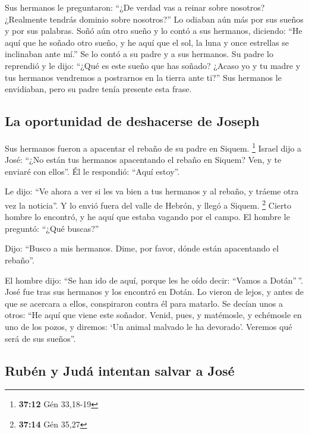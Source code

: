 \begin{paracol}{2}
 Sus hermanos le preguntaron: ``¿De verdad vas a reinar
sobre nosotros? ¿Realmente tendrás dominio sobre nosotros?'' Lo odiaban
aún más por sus sueños y por sus palabras.  Soñó aún otro
sueño y lo contó a sus hermanos, diciendo: ``He aquí que he soñado otro
sueño, y he aquí que el sol, la luna y once estrellas se inclinaban ante
mí.''  Se lo contó a su padre y a sus hermanos. Su padre
lo reprendió y le dijo: ``¿Qué es este sueño que has soñado? ¿Acaso yo y
tu madre y tus hermanos vendremos a postrarnos en la tierra ante ti?''
 Sus hermanos le envidiaban, pero su padre tenía presente
esta frase.

\hypertarget{la-oportunidad-de-deshacerse-de-joseph}{%
\subsection{La oportunidad de deshacerse de
Joseph}\label{la-oportunidad-de-deshacerse-de-joseph}}

 Sus hermanos fueron a apacentar el rebaño de su padre en
Siquem. \footnote{\textbf{37:12} Gén 33,18-19}  Israel
dijo a José: ``¿No están tus hermanos apacentando el rebaño en Siquem?
Ven, y te enviaré con ellos''. Él le respondió: ``Aquí estoy''.

 Le dijo: ``Ve ahora a ver si les va bien a tus hermanos
y al rebaño, y tráeme otra vez la noticia''. Y lo envió fuera del valle
de Hebrón, y llegó a Siquem. \footnote{\textbf{37:14} Gén 35,27}
 Cierto hombre lo encontró, y he aquí que estaba vagando
por el campo. El hombre le preguntó: ``¿Qué buscas?''

 Dijo: ``Busco a mis hermanos. Dime, por favor, dónde
están apacentando el rebaño''.

 El hombre dijo: ``Se han ido de aquí, porque les he oído
decir: ``Vamos a Dotán''\,''. José fue tras sus hermanos y los encontró
en Dotán.  Lo vieron de lejos, y antes de que se acercara
a ellos, conspiraron contra él para matarlo.  Se decían
unos a otros: ``He aquí que viene este soñador.  Venid,
pues, y matémosle, y echémosle en uno de los pozos, y diremos: `Un
animal malvado le ha devorado'. Veremos qué será de sus sueños''.

\hypertarget{rubuxe9n-y-juduxe1-intentan-salvar-a-josuxe9}{%
\subsection{Rubén y Judá intentan salvar a
José}\label{rubuxe9n-y-juduxe1-intentan-salvar-a-josuxe9}}


\end{paracol}
